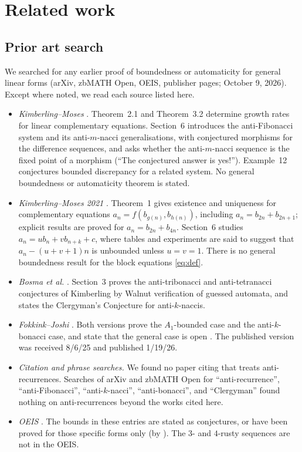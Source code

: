 \documentclass[11pt]{amsart}
\theoremstyle{definition}
\theoremstyle{remark}
\begin{document}
\section{Related work}\label{sec:related}
\subsection*{Prior art search}
We searched for any earlier proof of boundedness or automaticity for general linear forms (arXiv, zbMATH Open, OEIS, publisher pages; October 9, 2026). Except where noted, we read each source listed here.
\begin{itemize}
\item \emph{Kimberling--Moses} \cite{KM}. Theorem~2.1 and Theorem~3.2 determine growth rates for linear complementary equations. Section~6 introduces the anti-Fibonacci system and its anti-$m$-nacci generalisations, with conjectured morphisms for the difference sequences, and asks whether the anti-$m$-nacci sequence is the fixed point of a morphism (``The conjectured answer is yes!''). Example~12 conjectures bounded discrepancy for a related system. No general boundedness or automaticity theorem is stated.
\item \emph{Kimberling--Moses 2021} \cite{KM21}. Theorem~1 gives existence and uniqueness for complementary equations $a_n=f(b_{g(n)},b_{h(n)})$, including $a_n=b_{2n}+b_{2n+1}$; explicit results are proved for $a_n=b_{2n}+b_{4n}$. Section~6 studies $a_n=ub_n+vb_{n+k}+c$, where tables and experiments are said to suggest that $a_n-(u+v+1)n$ is unbounded unless $u=v=1$. There is no general boundedness result for the block equations \eqref{eq:def}.
\item \emph{Bosma et al.} \cite{Bosma}. Section~3 proves the anti-tribonacci and anti-tetranacci conjectures of Kimberling by Walnut verification of guessed automata, and states the Clergyman's Conjecture for anti-$k$-naccis.
\item \emph{Fokkink--Joshi} \cite{FJarxiv,FJ}. Both versions prove the $A_1$-bounded case and the anti-$k$-bonacci case, and state that the general case is open \cite[\S6]{FJ}. The published version was received 8/6/25 and published 1/19/26.
\item \emph{Citation and phrase searches.} We found no paper citing \cite{FJarxiv,FJ} that treats anti-recurrences. Searches of arXiv and zbMATH Open for ``anti-recurrence'', ``anti-Fibonacci'', ``anti-$k$-nacci'', ``anti-bonacci'', and ``Clergyman'' found nothing on anti-recurrences beyond the works cited here.
\item \emph{OEIS} \cite{A075326,A265389,A299409,A304499,A304502}. The bounds in these entries are stated as conjectures, or have been proved for those specific forms only (by \cite{Bosma,FJarxiv}). The $3$- and $4$-rusty sequences are not in the OEIS.

\end{itemize}
\end{document}
